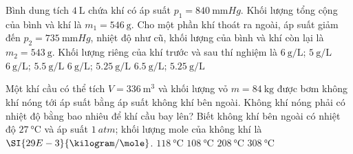 \begin{ex}
	Bình dung tích $\SI{4}{\liter}$ chứa khí có áp suất $p_1=\SI{840}{\milli\meter Hg}$. Khối lượng tổng cộng của bình và khí là $m_1=\SI{546}{\gram}$. Cho một phần khí thoát ra ngoài, áp suất giảm đến $p_2=\SI{735}{\milli\meter Hg}$, nhiệt độ như cũ, khối lượng của bình và khí còn lại là $m_2=\SI{543}{\gram}$. Khối lượng riêng của khí trước và sau thí nghiệm là
	\choice
	{$\SI{6}{\gram/\liter}$; $\SI{5}{\gram/\liter}$}
	{$\SI{6}{\gram/\liter}$; $\SI{5.5}{\gram/\liter}$}
	{\True $\SI{6}{\gram/\liter}$; $\SI{5.25}{\gram/\liter}$}
	{$\SI{6.5}{\gram/\liter}$; $\SI{5.25}{\gram/\liter}$}
\end{ex}
\begin{ex}
Một khí cầu có thể tích $V=\SI{336}{\meter^3}$ và khối lượng vỏ $m=\SI{84}{\kilogram}$ được bơm không khí nóng tới áp suất bằng áp suất không khí bên ngoài. Không khí nóng phải có nhiệt độ bằng bao nhiêu để khí cầu bay lên? Biết không khí bên ngoài có nhiệt độ $\SI{27}{\celsius}$ và áp suất $\SI{1}{atm}$; khối lượng mole của không khí là $\SI{29E-3}{\kilogram/\mole}$.
	\choice
	{$\SI{118}{\celsius}$}
	{\True $\SI{108}{\celsius}$}
	{$\SI{208}{\celsius}$}
	{$\SI{308}{\celsius}$}
\end{ex}
